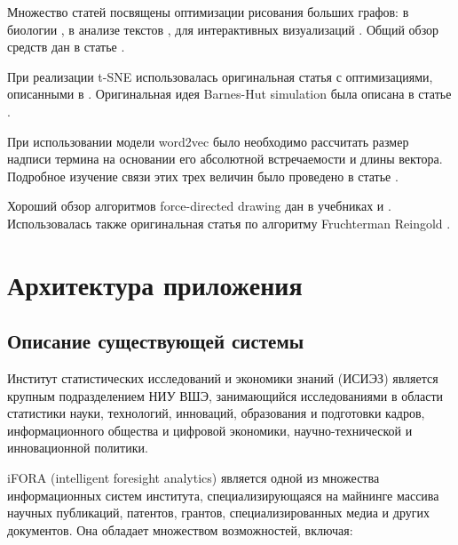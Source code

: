 Множество статей посвящены оптимизации рисования больших графов: в биологии \cite{bio_graph}, в анализе текстов \cite{large_document}, для интерактивных визуализаций \cite{interactive_large_graph}. Общий обзор средств дан в статье \cite{large_graph_survey}.

При реализации t-SNE использовалась оригинальная статья \cite{tsne} с оптимизациями, описанными в \cite{acc_tsne}. Оригинальная идея Barnes-Hut simulation была описана в статье \cite{barnes_hut}.

При использовании модели word2vec было необходимо рассчитать размер надписи термина на основании его абсолютной встречаемости и длины вектора. Подробное изучение связи этих трех величин было проведено в статье \cite{v2w_length}.

Хороший обзор алгоритмов force-directed drawing дан в учебниках \cite{book_graph_drawing} и \cite{book_force}. Использовалась также оригинальная статья по алгоритму Fruchterman Reingold \cite{fr}.


\chapter{Архитектура приложения}

\section{Описание существующей системы}

Институт статистических исследований и экономики знаний (ИСИЭЗ) является крупным подразделением НИУ ВШЭ, занимающийся исследованиями в области статистики науки, технологий, инноваций, образования и подготовки кадров, информационного общества и цифровой экономики, научно-технической и инновационной политики.

iFORA (intelligent foresight analytics) является одной из множества информационных систем института, специализирующаяся на майнинге массива научных публикаций, патентов, грантов, специализированных медиа и других документов. Она обладает множеством возможностей, включая:

